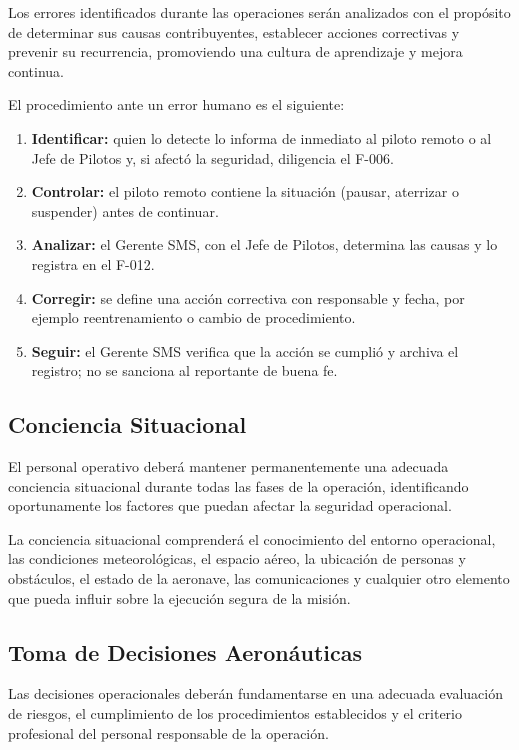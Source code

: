 Los errores identificados durante las operaciones serán analizados con el propósito de determinar sus causas contribuyentes, establecer acciones correctivas y prevenir su recurrencia, promoviendo una cultura de aprendizaje y mejora continua.

El procedimiento ante un error humano es el siguiente:
\begin{enumerate}
\item \textbf{Identificar:} quien lo detecte lo informa de inmediato al piloto remoto o al Jefe de Pilotos y, si afectó la seguridad, diligencia el F-006.
\item \textbf{Controlar:} el piloto remoto contiene la situación (pausar, aterrizar o suspender) antes de continuar.
\item \textbf{Analizar:} el Gerente SMS, con el Jefe de Pilotos, determina las causas y lo registra en el F-012.
\item \textbf{Corregir:} se define una acción correctiva con responsable y fecha, por ejemplo reentrenamiento o cambio de procedimiento.
\item \textbf{Seguir:} el Gerente SMS verifica que la acción se cumplió y archiva el registro; no se sanciona al reportante de buena fe.
\end{enumerate}

\subsection{Conciencia Situacional}

El personal operativo deberá mantener permanentemente una adecuada conciencia situacional durante todas las fases de la operación, identificando oportunamente los factores que puedan afectar la seguridad operacional.

La conciencia situacional comprenderá el conocimiento del entorno operacional, las condiciones meteorológicas, el espacio aéreo, la ubicación de personas y obstáculos, el estado de la aeronave, las comunicaciones y cualquier otro elemento que pueda influir sobre la ejecución segura de la misión.

\subsection{Toma de Decisiones Aeronáuticas}

Las decisiones operacionales deberán fundamentarse en una adecuada evaluación de riesgos, el cumplimiento de los procedimientos establecidos y el criterio profesional del personal responsable de la operación.

